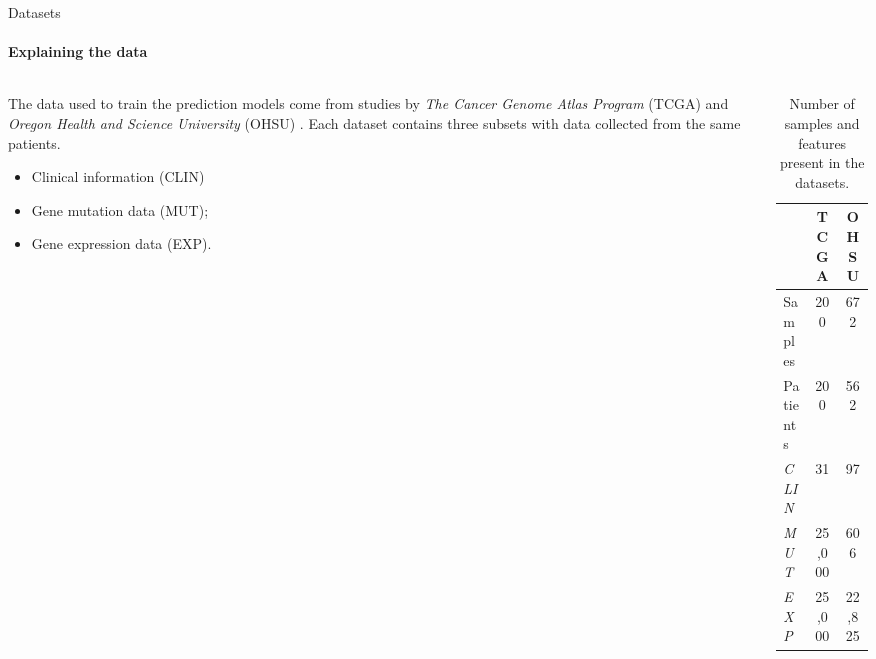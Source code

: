 
\begin{frame}[fragile]{Datasets}
\framesubtitle{Explaining the data}
\begin{columns}
\begin{column}{0.6\textwidth}

The data used to train the prediction models come from studies by \emph{The Cancer Genome Atlas Program} (TCGA) and \emph{Oregon Health and Science University} (OHSU) \cite{Genomic-2013, Nature-2018}. Each dataset contains three subsets with data collected from the same patients.

\begin{itemize}
\item Clinical information (CLIN)
\item Gene mutation data (MUT);
\item Gene expression data (EXP).
\end{itemize}
\end{column}


\begin{column}{0.4\textwidth}

\begin{table}[!htb]
    \centering
    \begin{tabular}{c|c|c|}
    
    \cline{2-3}
    &  \textbf{TCGA} & \textbf{OHSU} \\ \hline

    \multicolumn{1}{|l|}{Samples} & 200  &  672 \\ \hline
    \multicolumn{1}{|l|}{Patients}  & 200 & 562 \\ \hline
    \multicolumn{1}{|l|}{\emph{CLIN}} & 31  & 97 \\ \hline
    \multicolumn{1}{|l|}{\emph{MUT}} & 25,000 &  606 \\ \hline
   \multicolumn{1}{|l|}{\emph{EXP}} & 25,000 & 22,825 \\ \hline
    \end{tabular}
    \caption{Number of samples and features present in the datasets.}
\end{table}

\end{column}
\end{columns}

\end{frame}



